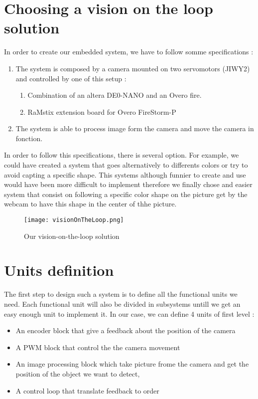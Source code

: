 \section{Choosing a vision on the loop solution}

In order to create our embedded system, we have to follow somme specifications : 

\begin{enumerate}
 \item The system is composed by a camera mounted on two servomotors (JIWY2) and controlled by one of this setup :
 \begin{enumerate}
  \item Combination of an altera DE0-NANO and an Overo fire.
  \item RaMstix extension board for Overo FireStorm-P
 \end{enumerate}
 \item The system is able to process image form the camera and move the camera in fonction.
\end{enumerate}

In order to follow this specifications, there is several option. For example, we could have created a system that goes alternatively to differents colors or try to avoid capting a specific shape. This systems although funnier to create and use would have been more difficult to implement therefore we finally chose and easier system that consist on following a specific color shape on the picture get by the webcam to have this shape in the center of thhe picture.

\begin{figure}[!ht]
\centering
 \texttt{[image: visionOnTheLoop.png]}
 \caption{Our vision-on-the-loop solution}
 \label{votl}
\end{figure}

\section{Units definition}

The first step to design such a system is  to define all the functional units we need. Each functional unit will also be divided in subsystems untill we get an easy enough unit to implement it. In our case, we can define 4 units of first level : 

\begin{itemize}
 \item An encoder block that give a feedback about the position of the camera
 \item A PWM block that control the the camera movement
 \item An image processing block which take picture frome the camera and get the position of the object we want to detect,
 \item A control loop that translate feedback to order
\end{itemize}


